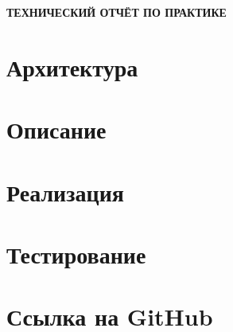 \begin{center}
\bfseries{\large ТЕХНИЧЕСКИЙ ОТЧЁТ ПО ПРАКТИКЕ}
\end{center}

\section*{Архитектура}
\section*{Описание}
\section*{Реализация}
\section*{Тестирование}
\section*{Ссылка на GitHub}
\pagebreak
